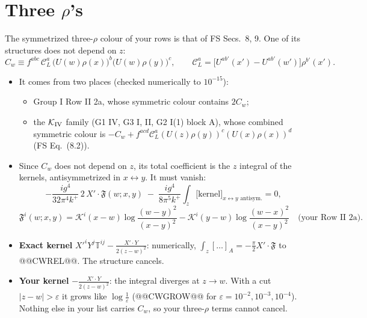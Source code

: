 \documentclass[10pt]{article}
\numberwithin{equation}{section}
\newcommand{\KK}{\mathcal K}
\newcommand{\CL}{\mathcal C_L}
\begin{document}
\section{Three \texorpdfstring{$\rho$}{rho}'s}\label{sec:three}
The symmetrized three-$\rho$ colour of your rows is that of FS Secs.~8, 9. One of its structures does not depend on $z$:
\begin{equation}
C_w\equiv f^{abc}\,\CL^a\,\big(U(w)\rho(x)\big)^b\big(U(w)\rho(y)\big)^c,\qquad \CL^a=\big[U^{ab'}(x')-U^{ab'}(w')\big]\rho^{b'}(x').
\end{equation}
\begin{itemize}
\item It comes from two places (checked numerically to $10^{-15}$):
\begin{itemize}
\item Group I Row II 2a, whose symmetric colour contains $2C_w$;
\item the $\KK_{\rm IV}$ family (G1 IV, G3 I, II, G2 I(1) block A), whose combined symmetric colour is $-C_w+f^{acd}\CL^a(U(z)\rho(y))^c(U(x)\rho(x))^d$ (FS Eq.~(8.2)).
\end{itemize}
\item Since $C_w$ does not depend on $z$, its total coefficient is the $z$ integral of the kernels, antisymmetrized in $x\leftrightarrow y$. It must vanish:
\begin{equation}
-\frac{ig^4}{32\pi^4k^+}\,2\,X'\!\cdot\mathfrak F(w;x,y)\;-\;\frac{ig^4}{8\pi^5k^+}\int_z\big[\text{kernel}\big]_{x\leftrightarrow y\text{ antisym.}}=0,
\end{equation}
\begin{equation*}
\mathfrak F^i(w;x,y)=\KK^i(x-w)\log\frac{(w-y)^2}{(x-y)^2}-\KK^i(y-w)\log\frac{(w-x)^2}{(x-y)^2}\quad\text{(your Row II 2a)}.
\end{equation*}
\item \textbf{Exact kernel} $X'^iY^j\mathbb T^{ij}-\frac{X'\cdot Y}{2(z-w)^2}$: numerically, $\int_z[\dots]_A=-\frac\pi2X'\!\cdot\mathfrak F$ to @@CWREL@@. The structure cancels.
\item \textbf{Your kernel} $-\frac{X'\cdot Y}{2(z-w)^2}$: the integral diverges at $z\to w$. With a cut $|z-w|>\varepsilon$ it grows like $\log\frac1\varepsilon$ (@@CWGROW@@ for $\varepsilon=10^{-2},10^{-3},10^{-4}$). Nothing else in your list carries $C_w$, so your three-$\rho$ terms cannot cancel.
\end{itemize}
\end{document}
